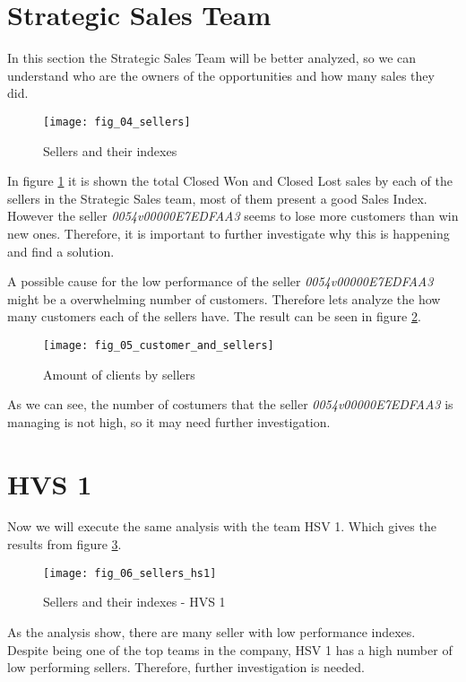 \documentclass[]{report}
\begin{document}
\clearpage
\section{Strategic Sales Team}

In this section the Strategic Sales Team will be better analyzed, so we can understand who are the owners of the opportunities and how many sales they did. 

\begin{figure}[htb]
	\centering
	\texttt{[image: fig\_04\_sellers]}
	\caption{Sellers and their indexes}
	\label{fig:fig_04}
\end{figure}

In figure \ref{fig:fig_04} it is shown the total Closed Won and Closed Lost sales by each of the sellers in the Strategic Sales team, most of them present a good Sales Index. However the seller \textit{0054v00000E7EDFAA3} seems to lose more customers than win new ones. Therefore, it is important to further investigate why this is happening and find a solution.

A possible cause for the low performance of the seller \textit{0054v00000E7EDFAA3} might be a overwhelming number of customers. Therefore lets analyze the how many customers each of the sellers have. The result can be seen in figure \ref{fig:fig_05}.

\begin{figure}[htb]
	\centering
	\texttt{[image: fig\_05\_customer\_and\_sellers]}
	\caption{Amount of clients by sellers}
	\label{fig:fig_05}
\end{figure}

As we can see, the number of costumers that the seller \textit{0054v00000E7EDFAA3} is managing is not high, so it may need further investigation.

\section{HVS 1}

Now we will execute the same analysis with the team HSV 1. Which gives the results from figure \textcolor{blue}{\ref{fig:fig_06}}.

\begin{figure}[htb]
	\centering
	\texttt{[image: fig\_06\_sellers\_hs1]}
	\caption{Sellers and their indexes - HVS 1}
	\label{fig:fig_06}
\end{figure}

As the analysis show, there are many seller with low performance indexes. Despite being one of the top teams in the company, HSV 1 has a high number of low performing sellers. Therefore, further investigation is needed.
\end{document}

